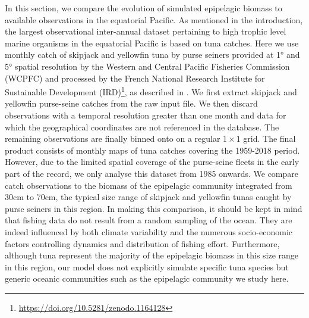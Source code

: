 In this section, we compare the evolution of simulated epipelagic biomass to available observations in the equatorial Pacific. As mentioned in the introduction, the largest observational inter-annual dataset pertaining to high trophic level marine organisms in the equatorial Pacific is based on tuna catches. Here we use monthly catch of skipjack and yellowfin tuna by purse seiners provided at 1° and 5° spatial resolution by the Western and Central Pacific Fisheries Commission (WCPFC) and processed by the French National Research Institute for Sustainable Development (IRD)\footnote{\url{https://doi.org/10.5281/zenodo.1164128}}, as described in  \citep{taconetGlobalMonthlyCatch2018}. We first extract skipjack and yellowfin purse-seine catches from the raw input file. We then discard observations with a temporal resolution greater than one month and data for which the geographical coordinates are not referenced in the database. The remaining observations are finally binned onto on a regular $1 \times 1$ grid. The final product consists of monthly maps of tuna catches covering the 1959-2018 period. However, due to the limited spatial coverage of the purse-seine fleets in the early part of the record, we only analyse this dataset from 1985 onwards. We compare catch observations to the biomass of the epipelagic community integrated from 30cm to 70cm, the typical size range of  skipjack and yellowfin tunas caught by purse seiners in this region. In making this comparison, it should be kept in mind that fishing data do not result from a random sampling of the ocean. They are indeed influenced by both climate variability and the numerous socio-economic factors controlling dynamics and distribution of fishing effort. Furthermore, although tuna represent the majority of the epipelagic biomass in this size range in this region, our model does not explicitly simulate specific tuna species but generic oceanic communities such as the epipelagic community we study here.

